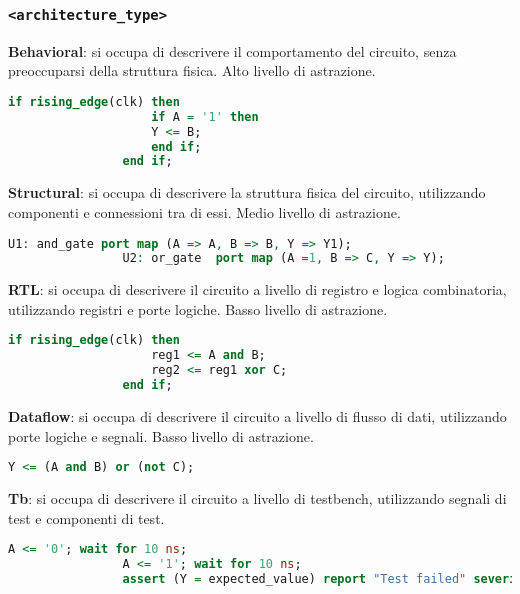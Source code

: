         \subsubsection{\texttt{<architecture\_type>}}
            \textbf{Behavioral}: si occupa di descrivere il comportamento del circuito, senza preoccuparsi della struttura fisica. Alto livello di astrazione.
            \begin{lstlisting}[language=VHDL]
                if rising_edge(clk) then
                    if A = '1' then
                    Y <= B;
                    end if;
                end if;
            \end{lstlisting}

            \textbf{Structural}: si occupa di descrivere la struttura fisica del circuito, utilizzando componenti e connessioni tra di essi. Medio livello di astrazione.
            \begin{lstlisting}[language=VHDL]
                U1: and_gate port map (A => A, B => B, Y => Y1);
                U2: or_gate  port map (A =1, B => C, Y => Y);
            \end{lstlisting}

            \textbf{RTL}: si occupa di descrivere il circuito a livello di registro e logica combinatoria, utilizzando registri e porte logiche. Basso livello di astrazione.
            \begin{lstlisting}[language=VHDL]
                if rising_edge(clk) then
                    reg1 <= A and B;
                    reg2 <= reg1 xor C;
                end if;
            \end{lstlisting}

            \textbf{Dataflow}: si occupa di descrivere il circuito a livello di flusso di dati, utilizzando porte logiche e segnali. Basso livello di astrazione.
            \begin{lstlisting}[language=VHDL]
                Y <= (A and B) or (not C);
            \end{lstlisting}

            \textbf{Tb}: si occupa di descrivere il circuito a livello di testbench, utilizzando segnali di test e componenti di test.
            \begin{lstlisting}[language=VHDL]
                A <= '0'; wait for 10 ns;
                A <= '1'; wait for 10 ns;
                assert (Y = expected_value) report "Test failed" severity error;
            \end{lstlisting}

